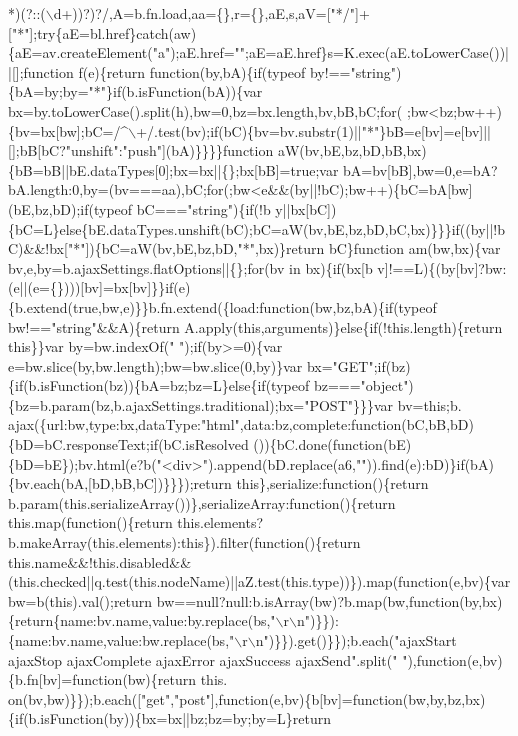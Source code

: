 \begin{DoxyCode}
{      *)(?::(\(\backslash\)d+))?)?/,A=b.fn.load,aa=\{\},r=\{\},aE,s,aV=["*/"]+["*"];try\{aE=bl.href\}catch(aw)\{aE=av.createElement("a");aE.href="";aE=aE.href\}s=K.exec(aE.toLowerCase())||[];function f(e)\{return function(by,bA)\{if(typeof
       by!=="string")\{bA=by;by="*"\}if(b.isFunction(bA))\{var
       bx=by.toLowerCase().split(h),bw=0,bz=bx.length,bv,bB,bC;for(
      ;bw<bz;bw++)\{bv=bx[bw];bC=/^\(\backslash\)+/.test(bv);if(bC)\{bv=bv.substr(1)||"*"\}bB=e[bv]=e[bv]||[];bB[bC?"unshift":"push"](bA)\}\}\}\}function aW(bv,bE,bz,bD,bB,bx)\{bB=bB||bE.dataTypes[0];bx=bx||\{\};bx[bB]=true;var
       bA=bv[bB],bw=0,e=bA?bA.length:0,by=(bv===aa),bC;for(;bw<e&&(by||!bC);bw++)\{bC=bA[bw](bE,bz,bD);if(typeof
       bC==="string")\{if(!b
      y||bx[bC])\{bC=L\}else\{bE.dataTypes.unshift(bC);bC=aW(bv,bE,bz,bD,bC,bx)\}\}\}if((by||!bC)&&!bx["*"])\{bC=aW(bv,bE,bz,bD,"*",bx)\}return bC\}function am(bw,bx)\{var bv,e,by=b.ajaxSettings.flatOptions||\{\};for(bv in
       bx)\{if(bx[b
      v]!==L)\{(by[bv]?bw:(e||(e=\{\})))[bv]=bx[bv]\}\}if(e)\{b.extend(true,bw,e)\}\}b.fn.extend(\{load:function(bw,bz,bA)\{if(typeof bw!=="string"&&A)\{return A.apply(this,arguments)\}else\{if(!this.length)\{return this\}\}var
       by=bw.indexOf(" ");if(by>=0)\{var e=bw.slice(by,bw.length);bw=bw.slice(0,by)\}var
       bx="GET";if(bz)\{if(b.isFunction(bz))\{bA=bz;bz=L\}else\{if(typeof bz==="object")\{bz=b.param(bz,b.ajaxSettings.traditional);bx="POST"\}\}\}var
       bv=this;b.
      ajax(\{url:bw,type:bx,dataType:"html",data:bz,complete:function(bC,bB,bD)\{bD=bC.responseText;if(bC.isResolved
      ())\{bC.done(function(bE)\{bD=bE\});bv.html(e?b("<div>").append(bD.replace(a6,"")).find(e):bD)\}if(bA)\{bv.each(bA,[bD,bB,bC])\}\}\});return this\},serialize:function()\{return
       b.param(this.serializeArray())\},serializeArray:function()\{return this.map(function()\{return
       this.elements?b.makeArray(this.elements):this\}).filter(function()\{return
       this.name&&!this.disabled&&(this.checked||q.test(this.nodeName)||aZ.test(this.type))\}).map(function(e,bv)\{var bw=b(this).val();return
       bw==null?null:b.isArray(bw)?b.map(bw,function(by,bx)\{return\{name:bv.name,value:by.replace(bs,"\(\backslash\)r\(\backslash\)n")\}\}):\{name:bv.name,value:bw.replace(bs,"\(\backslash\)r\(\backslash\)n")\}\}).get()\}\});b.each("ajaxStart
       ajaxStop ajaxComplete ajaxError ajaxSuccess ajaxSend".split(" "),function(e,bv)\{b.fn[bv]=function(bw)\{return
       this.
      on(bv,bw)\}\});b.each(["get","post"],function(e,bv)\{b[bv]=function(bw,by,bz,bx)\{if(b.isFunction(by))\{bx=bx||bz;bz=by;by=L\}return
}
\end{DoxyCode}
